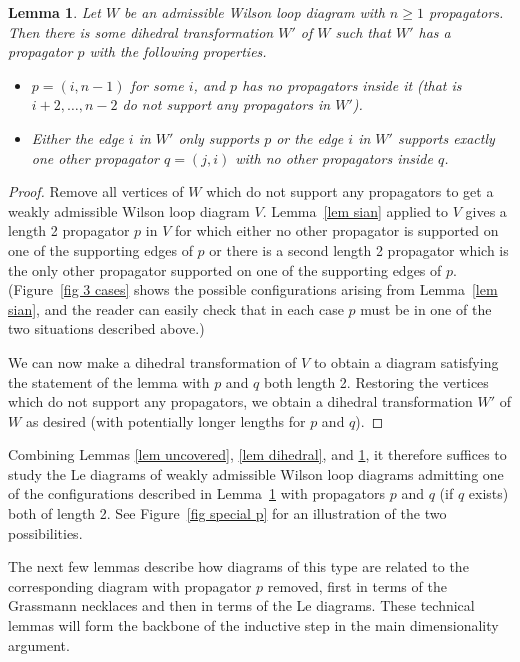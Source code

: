 \documentclass[11pt]{article}
\newtheorem{lem}[thm]{Lemma}
\theoremstyle{remark}
\theoremstyle{definition}
\begin{document}
\begin{lem}\label{lem good p}
  Let $W$ be an admissible Wilson loop diagram with $n\geq 1$ propagators.  Then there is some dihedral transformation $W'$ of $W$ such that $W'$ has a propagator $p$ with the following properties.
  \begin{itemize}
  \item $p = (i, n-1)$ for some $i$, and $p$ has no propagators inside it (that is $i+2, \ldots, n-2$ do not support any propagators in $W'$).
  \item Either the edge $i$ in $W'$ only supports $p$ or the edge $i$ in $W'$ supports exactly one other propagator $q = (j, i)$ with no other propagators inside $q$.
  \end{itemize}
\end{lem}

\begin{proof}
  Remove all vertices of $W$ which do not support any propagators to get a weakly admissible Wilson loop diagram $V$.  Lemma~\ref{lem sian} applied to $V$ gives a length 2 propagator $p$ in $V$ for which either no other propagator is supported on one of the supporting edges of $p$ or there is a second length 2 propagator which is the only other propagator supported on one of the supporting edges of $p$.  (Figure~\ref{fig 3 cases} shows the possible configurations arising from Lemma~\ref{lem sian}, and the reader can easily check that in each case $p$ must be in one of the two situations described above.)

  We can now make a dihedral transformation of $V$ to obtain a diagram satisfying the statement of the lemma with $p$ and $q$ both length 2. Restoring the vertices which do not support any propagators, we obtain a dihedral transformation $W'$ of $W$ as desired (with potentially longer lengths for $p$ and $q$).
\end{proof}



Combining Lemmas \ref{lem uncovered}, \ref{lem dihedral}, and \ref{lem good p}, it therefore suffices to study the Le diagrams of weakly admissible Wilson loop diagrams admitting one of the configurations described in Lemma~\ref{lem good p} with propagators $p$ and $q$ (if $q$ exists) both of length 2. See Figure~\ref{fig special p} for an illustration of the two possibilities.

The next few lemmas describe how diagrams of this type are related to the corresponding diagram with propagator $p$ removed, first in terms of the Grassmann necklaces and then in terms of the Le diagrams. These technical lemmas will form the backbone of the inductive step in the main dimensionality argument.
\end{document}
